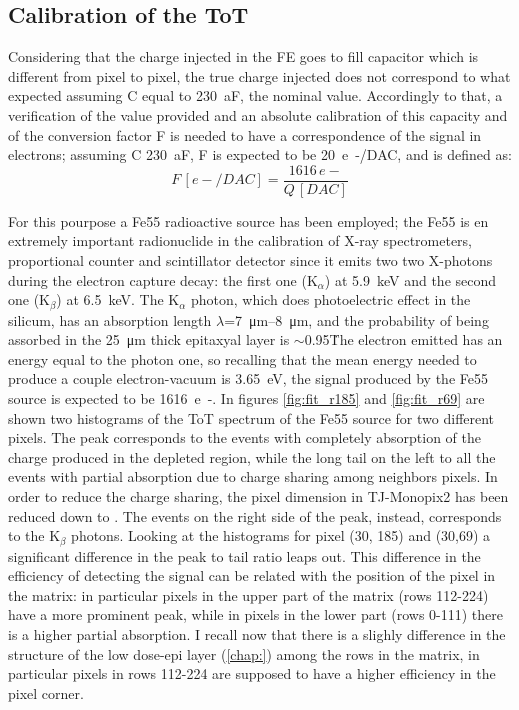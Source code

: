         \subsection{Calibration of the ToT}
        Considering that the charge injected in the FE goes to fill capacitor which is different from pixel to pixel, the true charge injected does not correspond to what expected assuming C equal to \SI{230}{aF}, the nominal value. 
        Accordingly to that, a verification of the value provided and an absolute calibration of this capacity and of the conversion factor F is needed to have a correspondence of the signal in electrons; assuming C \SI{230}{aF}, F is expected to be \SI{20}{e-/DAC}, and is defined as:
        \begin{equation}
            F\, [e-/DAC] = \frac{1616\,e-}{Q\,[DAC]}
        \end{equation}

        For this pourpose a Fe55 radioactive source has been employed; the Fe55 is en extremely important radionuclide in the calibration of X-ray spectrometers, proportional counter and scintillator detector since it emits two two X-photons during the electron capture decay: the first one (K$_\alpha$) at \SI{5.9}{keV} and the second one (K$_\beta$) at \SI{6.5}{keV}.
        The K$_\alpha$ photon, which does photoelectric effect in the silicum, has an absorption length $\lambda$=\SIrange{7}{8}{\um}, and the probability of being assorbed in the \SI{25}{\um} thick epitaxyal layer is $\sim$0.95\.
        The electron emitted has an energy equal to the photon one, so recalling that the mean energy needed to produce a couple electron-vacuum is \SI{3.65}{eV}, the signal produced by the Fe55 source is expected to be \SI{1616}{e-}.
        In figures \ref{fig:fit_r185} and \ref{fig:fit_r69} are shown two histograms of the ToT spectrum of the Fe55 source for two different pixels. The peak corresponds to the events with completely absorption of the charge produced in the depleted region, while the long tail on the left to all the events with partial absorption due to charge sharing among neighbors pixels. In order to reduce the charge sharing, the pixel dimension in TJ-Monopix2 has been reduced down to . 
        The events on the right side of the peak, instead, corresponds to the K$_{\beta}$ photons. 
        Looking at the histograms for pixel (30, 185) and (30,69) a significant difference in the peak to tail ratio leaps out. 
        This difference in the efficiency of detecting the signal can be related with the position of the pixel in the matrix: in particular pixels in the upper part of the matrix (rows 112-224) have a more prominent peak, while in pixels in the lower part (rows 0-111) there is a higher partial absorption. 
        I recall now that there is a slighly difference in the structure of the low dose-epi layer (\ref{chap:}) among the rows in the matrix, in particular pixels in rows 112-224 are supposed to have a higher efficiency in the pixel corner. 
        
